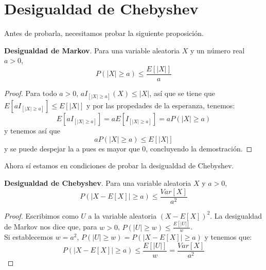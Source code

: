 \section{Desigualdad de Chebyshev}\label{st:Cheby}
Antes de probarla, necesitamos probar la siguiente proposición.
\begin{proposicion}
\textbf{Desigualdad de Markov}. Para una variable aleatoria $X$ y un número real $a>0$,
\[ P(\vert X \vert \geq a) \leq \frac{E \left[ \vert X \vert \right]}{a} \]
\end{proposicion}
\begin{proof}
Para todo $a>0$, $aI_{[ \vert X \vert  \geq a]}(X) \leq \vert X \vert$, así que se tiene que $E[aI_{[ \vert X \vert  \geq a]}] \leq E[\vert X \vert]$ y por las propedades de la esperanza, tenemos:
\[ E[aI_{[ \vert X \vert  \geq a]}] = aE[I_{[ \vert X \vert  \geq a]}] = aP(\vert X \vert \geq a) \] y tenemos así que
\[ aP(\vert X \vert \geq a) \leq E \left[ \vert X \vert \right] \]
y se puede despejar la a pues es mayor que 0, concluyendo la demostración.
\end{proof}
Ahora sí estamos en condiciones de probar la desigualdad de Chebyshev.
\begin{proposicion}
\textbf{Desigualdad de Chebyshev}. Para una variable aleatoria $X$ y $a>0$,
\[ P(\vert X - E[X] \vert \geq a) \leq \frac{Var[X]}{a^{2}} \]
\end{proposicion}
\begin{proof}
Escribimos como $U$ a la variable aleatoria $(X - E[X])^{2}$. La desigualdad de Markov nos dice que, para $w>0$, $P(\vert U \vert \geq w) \leq \frac{E[\vert U \vert]}{w}$.\\
Si establecemos $w=a^{2}$, $P(\vert U \vert \geq w) = P(\vert X-E[X] \vert \geq a)$ y tenemos que:
\[ P(\vert X-E[X] \vert \geq a) \leq \frac{E[\vert U \vert]}{w}= \frac{Var[X]}{a^{2}} \]
\end{proof}
\cite{forsyth2018probability}

\endinput




















